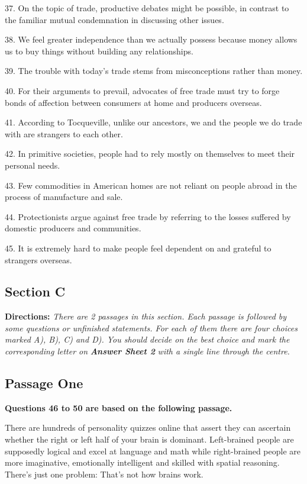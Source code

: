 \documentclass[UTF8,11pt]{ctexart}
\begin{document}
37. On the topic of trade, productive debates might be possible, in contrast to the familiar mutual condemnation in discussing other issues.


38. We feel greater independence than we actually possess because money allows us to buy things without building any relationships.


39. The trouble with today’s trade stems from misconceptions rather than money.


40. For their arguments to prevail, advocates of free trade must try to forge bonds of affection between consumers at home and producers overseas.


41. According to Tocqueville, unlike our ancestors, we and the people we do trade with are strangers to each other.


42. In primitive societies, people had to rely mostly on themselves to meet their personal needs.


43. Few commodities in American homes are not reliant on people abroad in the process of manufacture and sale.


44. Protectionists argue against free trade by referring to the losses suffered by domestic producers and communities.


45. It is extremely hard to make people feel dependent on and grateful to strangers overseas.


\subsection*{\textbf{Section C}}


\textbf{Directions: }\textit{There are 2 passages in this section. Each passage is followed by some questions or unfinished} \textit{statements. For each of them there are four choices marked A), B), C) and D). You should decide on the best} \textit{choice and mark the corresponding letter on }\textbf{\textit{Answer Sheet 2}}\textit{ with a single line through the centre.}


\subsection*{\textbf{Passage One}}


\textbf{Questions 46 to 50 are based on the following passage.}


There are hundreds of personality quizzes online that assert they can ascertain whether the right or left half of your brain is dominant. Left-brained people are supposedly logical and excel at language and math while right-brained people are more imaginative, emotionally intelligent and skilled with spatial reasoning. There’s just one problem: That’s not how brains work.
\end{document}
